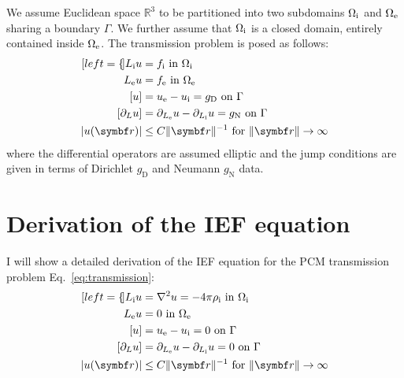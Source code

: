 \begin{defin}
We assume Euclidean space $\mathbb{R}^3$ to be partitioned into two subdomains
$\Omega_\mathrm{i}$ and $\Omega_\mathrm{e}$ sharing a boundary $\Gamma$. We further assume that
$\Omega_\mathrm{i}$ is a closed domain, entirely contained inside $\Omega_\mathrm{e}$.
The transmission problem is posed as follows:
\begin{subequations}\label{eq:transmission-general}
\begin{align}[left={\empheqlbrace}]
  \Li u &= f_\mathrm{i} \,\, \text{in}\,\, \Omegai \\
  \Le u &= f_\mathrm{e} \,\, \text{in}\,\, \Omegae \\
  [u] &= \ue - \ui = g_\mathrm{D} \,\, \text{on}\,\, \Gamma
   \\
[\partial_L u] &= \partiale u - \partiali u = g_\mathrm{N} \,\,
\text{on}\,\, \Gamma \\
|u(\vect{r})| &\leq C \|\vect{r} \|^{-1} \,\,\text{for}\,\,\| \vect{r} \|\rightarrow\infty
\end{align}
\end{subequations}
where the differential operators are assumed elliptic and the jump conditions are
given in terms of Dirichlet $g_\mathrm{D}$ and Neumann $g_\mathrm{N}$ data.
\end{defin}

\section{Derivation of the IEF equation}
I will show a detailed derivation of the \acrshort{IEF} equation
for the \acrshort{PCM} transmission problem Eq.~\eqref{eq:transmission}:
\begin{subequations}
  \begin{align}[left={\empheqlbrace}]
  \Li u &= \nabla^2 u = -4\pi\rhoi \,\, \text{in}\,\, \Omegai \\
  \Le u &= 0 \,\, \text{in}\,\, \Omegae \\
  [u] &= \ue - \ui = 0 \,\, \text{on}\,\, \Gamma \\
[\partial_L u] &= \partiale u - \partiali u = 0 \,\, \text{on}\,\, \Gamma \\
|u(\vect{r})| &\leq C \|\vect{r} \|^{-1} \,\,\text{for}\,\,\| \vect{r} \|\rightarrow\infty
\end{align}
\end{subequations}

